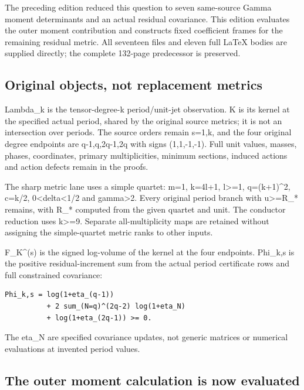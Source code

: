\documentclass[
]{article}
\begin{document}
The preceding edition reduced this question to seven same-source Gamma
moment determinants and an actual residual covariance. This edition
evaluates the outer moment contribution and constructs fixed coefficient
frames for the remaining residual metric. All seventeen files and eleven
full LaTeX bodies are supplied directly; the complete 132-page
predecessor is preserved.

\subsection{Original objects, not replacement
metrics}\label{original-objects-not-replacement-metrics}

Lambda\_k is the tensor-degree-k period/unit-jet observation. K is its
kernel at the specified actual period, shared by the original source
metrics; it is not an intersection over periods. The source orders
remain s=1,k, and the four original degree endpoints are q-1,q,2q-1,2q
with signs (1,1,-1,-1). Full unit values, masses, phases, coordinates,
primary multiplicities, minimum sections, induced actions and action
defects remain in the proofs.

The sharp metric lane uses a simple quartet: m=1, k=4l+1,
l\textgreater=1, q=(k+1)\^{}2, c=k/2, 0\textless delta\textless1/2 and
gamma\textgreater2. Every original period branch with
\textbar u\textbar\textgreater=R\_* remains, with R\_* computed from the
given quartet and unit. The conductor reduction uses k\textgreater=9.
Separate all-multiplicity maps are retained without assigning the
simple-quartet metric ranks to other inputs.

F\_K\^{}(s) is the signed log-volume of the kernel at the four
endpoints. Phi\_k,s is the positive residual-increment sum from the
actual period certificate rows and full constrained covariance:

\begin{verbatim}
Phi_k,s = log(1+eta_(q-1))
          + 2 sum_(N=q)^(2q-2) log(1+eta_N)
          + log(1+eta_(2q-1)) >= 0.
\end{verbatim}

The eta\_N are specified covariance updates, not generic matrices or
numerical evaluations at invented period values.

\subsection{The outer moment calculation is now
evaluated}\label{the-outer-moment-calculation-is-now-evaluated}
\end{document}
